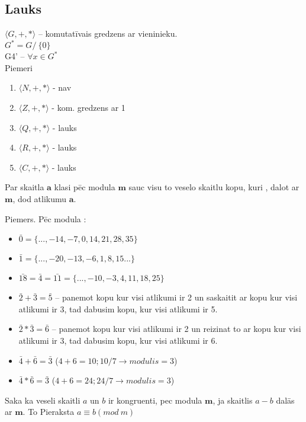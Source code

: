 \subsection{Lauks}
$\langle G, +, * \rangle$  -- komutatīvais gredzens ar vieninieku. \\
$G^* = G /\ \{0\}$\\
G4' -- $\forall x \in G^*$\\
Piemeri
\begin{enumerate}
  \item $\langle N, +, *\rangle$ - nav
  \item $\langle Z, +, *\rangle$ - kom. gredzens ar 1
  \item $\langle Q, +, *\rangle$ - lauks
  \item $\langle R, +, *\rangle$ - lauks
  \item $\langle C, +, *\rangle$ - lauks
\end{enumerate}

 Par skaitla $\boldsymbol{a}$  klasi pēc modula
 $\boldsymbol{m}$ sauc visu to veselo skaitlu kopu, kuri ,
 dalot ar $\boldsymbol{m}$, dod atlikumu $\boldsymbol{a}$.

  Piemers. Pēc modula :
  \begin{itemize}
    \item $\bar{0} = \{..., -14, -7, 0, 14, 21, 28, 35\}$
    \item $\bar{1} = \{..., -20, -13, -6, 1, 8, 15 ...\}$
    \item $\bar{18} = \bar{4} = \bar{11} = \{..., -10, -3, 4, 11, 18, 25\}$
    \item $\bar{2} + \bar{3} = \bar{5}$ -- panemot kopu kur visi atlikumi 
    ir 2 un saskaitit ar kopu kur visi atlikumi ir 3, tad dabusim kopu,
    kur visi atlikumi ir 5.
    
    \item $\bar{2} * \bar{3} = \bar{6}$ -- panemot kopu kur visi atlikumi
    ir 2 un reizinat to ar kopu kur visi atlikumi ir 3, tad dabusim kopu,
    kur visi atlikumi ir 6.
    
    \item $\bar{4} + \bar{6} = \bar{3}$  
    ($4 + 6 = 10; 10 / 7 \rightarrow modulis = 3$)
    
    \item $\bar{4} * \bar{6} = \bar{3}$ 
    ($4 + 6 = 24; 24 / 7 \rightarrow modulis = 3$)
  \end{itemize}

   Saka ka veseli skaitli $a$ un $b$ ir kongruenti, pec modula 
  $\boldsymbol{m}$, ja skaitlis $a-b$ dalās ar $\boldsymbol{m}$. To Pieraksta 
  $ a \equiv b (mod \ m)$

